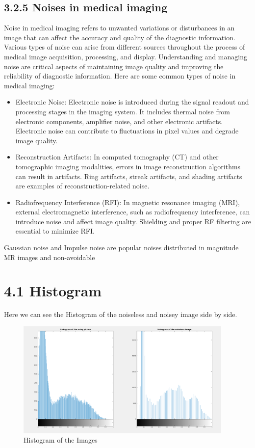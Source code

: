 \documentclass[12pt,fleqn]{article}
\begin{document}
\subsection{3.2.5 Noises in medical imaging}

Noise in medical imaging refers to unwanted variations or disturbances in an image that can affect the accuracy and quality of the diagnostic information. Various types of noise can arise from different sources throughout the process of medical image acquisition, processing, and display. Understanding and managing noise are critical aspects of maintaining image quality and improving the reliability of diagnostic information. Here are some common types of noise in medical imaging:
\begin{itemize}
    \item Electronic Noise: Electronic noise is introduced during the signal readout and processing stages in the imaging system. It includes thermal noise from electronic components, amplifier noise, and other electronic artifacts. Electronic noise can contribute to fluctuations in pixel values and degrade image quality.
    \item Reconstruction Artifacts: In computed tomography (CT) and other tomographic imaging modalities, errors in image reconstruction algorithms can result in artifacts. Ring artifacts, streak artifacts, and shading artifacts are examples of reconstruction-related noise.
    \item Radiofrequency Interference (RFI): In magnetic resonance imaging (MRI), external electromagnetic interference, such as radiofrequency interference, can introduce noise and affect image quality. Shielding and proper RF filtering are essential to minimize RFI.
\end{itemize}
Gaussian noise and Impulse noise are popular noises distributed in magnitude MR images and non-avoidable
\section{4.1 Histogram}
Here we can see the Histogram of the noiseless and noisey image side by side.
\begin{figure}[H]
	\centering
	\includegraphics[width=0.95\textwidth]{histogram.png}
	\caption{Histogram of the Images}
	\label{fig:2.3.3}
\end{figure}
\newpage
\end{document}
